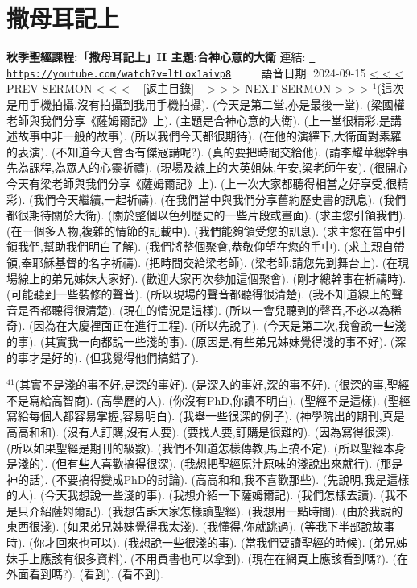 \documentclass{book}
\begin{document}
\section{撒母耳記上}
\label{sec:ltLox1aivp8}
\textbf{秋季聖經課程:「撒母耳記上」II 主題:合神心意的大衛}
\newline
\newline
連結: \href{https://youtube.com/watch?v=ltLox1aivp8}{\texttt{ https://youtube.com/watch?v=ltLox1aivp8}} ~~~~ 語音日期: 2024-09-15 
\newline
\newline
\hyperref[sec:EjR8UEB4pjs]{\small{< < < PREV SERMON < < <}}
~
\hyperref[sec:index]{\small{[返主目錄]}}
~
\hyperref[sec:A6e_76MEqBA]{\small{> > > NEXT SERMON > > >}}
\newline
\newline
$^{1}$(這次是用手機拍攝,沒有拍攝到我用手機拍攝).
(今天是第二堂,亦是最後一堂).
(梁國權老師與我們分享《薩姆爾記》上).
(主題是合神心意的大衛).
(上一堂很精彩,是講述故事中非一般的故事).
(所以我們今天都很期待).
(在他的演繹下,大衛面對素羅的表演).
(不知道今天會否有傑寇講呢?).
(真的要把時間交給他).
(請李耀華總幹事先為課程,為眾人的心靈祈禱).
(現場及線上的大英姐妹,午安,梁老師午安).
(很開心今天有梁老師與我們分享《薩姆爾記》上).
(上一次大家都聽得相當之好享受,很精彩).
(我們今天繼續,一起祈禱).
(在我們當中與我們分享舊約歷史書的訊息).
(我們都很期待關於大衛).
(關於整個以色列歷史的一些片段或畫面).
(求主您引領我們).
(在一個多人物,複雜的情節的記載中).
(我們能夠領受您的訊息).
(求主您在當中引領我們,幫助我們明白了解).
(我們將整個聚會,恭敬仰望在您的手中).
(求主親自帶領,奉耶穌基督的名字祈禱).
(把時間交給梁老師).
(梁老師,請您先到舞台上).
(在現場線上的弟兄姊妹大家好).
(歡迎大家再次參加這個聚會).
(剛才總幹事在祈禱時).
(可能聽到一些裝修的聲音).
(所以現場的聲音都聽得很清楚).
(我不知道線上的聲音是否都聽得很清楚).
(現在的情況是這樣).
(所以一會兒聽到的聲音,不必以為稀奇).
(因為在大廈裡面正在進行工程).
(所以先說了).
(今天是第二次,我會說一些淺的事).
(其實我一向都說一些淺的事).
(原因是,有些弟兄姊妹覺得淺的事不好).
(深的事才是好的).
(但我覺得他們搞錯了).

$^{41}$(其實不是淺的事不好,是深的事好).
(是深入的事好,深的事不好).
(很深的事,聖經不是寫給高智商).
(高學歷的人).
(你沒有PhD,你讀不明白).
(聖經不是這樣).
(聖經寫給每個人都容易掌握,容易明白).
(我舉一些很深的例子).
(神學院出的期刊,真是高高和和).
(沒有人訂購,沒有人要).
(要找人要,訂購是很難的).
(因為寫得很深).
(所以如果聖經是期刊的級數).
(我們不知道怎樣傳教,馬上搞不定).
(所以聖經本身是淺的).
(但有些人喜歡搞得很深).
(我想把聖經原汁原味的淺說出來就行).
(那是神的話).
(不要搞得變成PhD的討論).
(高高和和,我不喜歡那些).
(先說明,我是這樣的人).
(今天我想說一些淺的事).
(我想介紹一下薩姆爾記).
(我們怎樣去讀).
(我不是只介紹薩姆爾記).
(我想告訴大家怎樣讀聖經).
(我想用一點時間).
(由於我說的東西很淺).
(如果弟兄姊妹覺得我太淺).
(我懂得,你就跳過).
(等我下半部說故事時).
(你才回來也可以).
(我想說一些很淺的事).
(當我們要讀聖經的時候).
(弟兄姊妹手上應該有很多資料).
(不用買書也可以拿到).
(現在在網頁上應該看到嗎?).
(在外面看到嗎?).
(看到).
(看不到).
\end{document}
